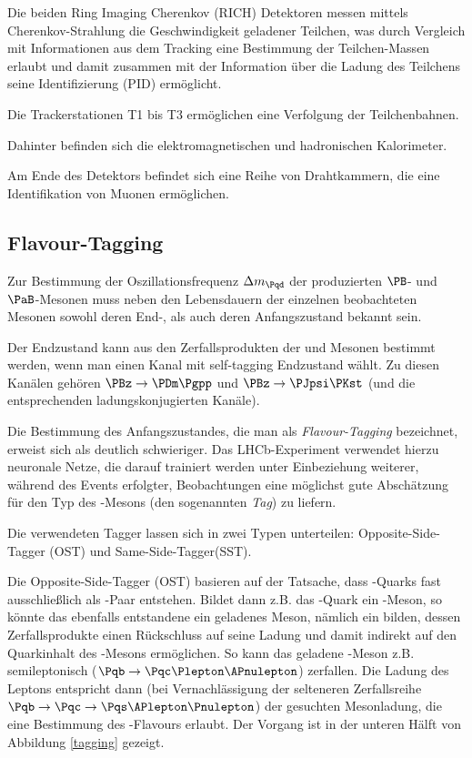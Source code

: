 Die beiden Ring Imaging Cherenkov (RICH) Detektoren messen mittels Cherenkov-Strahlung die Geschwindigkeit geladener Teilchen, was durch Vergleich mit Informationen aus dem Tracking eine Bestimmung der Teilchen-Massen erlaubt und damit zusammen mit der Information über die Ladung des Teilchens seine Identifizierung (PID) ermöglicht.

Die Trackerstationen T1 bis T3 ermöglichen eine Verfolgung der Teilchenbahnen.

Dahinter befinden sich die elektromagnetischen und hadronischen Kalorimeter.

Am Ende des Detektors befindet sich eine Reihe von Drahtkammern, die eine Identifikation von Muonen ermöglichen.



\begin{figure}
\end{figure}

\subsection{Flavour-Tagging}

Zur Bestimmung der Oszillationsfrequenz $\difference{m_{\Pqd}}$ der produzierten $\PB$- und $\PaB$-Mesonen muss neben den Lebensdauern der einzelnen beobachteten Mesonen sowohl deren End-, als auch deren Anfangszustand bekannt sein.

Der Endzustand kann aus den Zerfallsprodukten der \PBz und \PaBz Mesonen bestimmt werden, wenn man einen Kanal mit self-tagging Endzustand wählt.
Zu diesen Kanälen gehören $\PBz \to \PDm \Pgpp$ und $\PBz \to \PJpsi \PKst$ (und die entsprechenden ladungskonjugierten Kanäle).

Die Bestimmung des Anfangszustandes, die man als \emph{Flavour-Tagging} bezeichnet, erweist sich als deutlich schwieriger.
Das LHCb-Experiment verwendet hierzu neuronale Netze, die darauf trainiert werden unter Einbeziehung weiterer, während des Events erfolgter, Beobachtungen eine möglichst gute Abschätzung für den Typ des \PB-Mesons (den sogenannten \emph{Tag}) zu liefern.

Die verwendeten Tagger lassen sich in zwei Typen unterteilen: Opposite-Side-Tagger (OST) und Same-Side-Tagger(SST).

Die Opposite-Side-Tagger (OST) basieren auf der Tatsache, dass \Pqb-Quarks fast ausschließlich als \Pqb\Paqb-Paar entstehen. Bildet dann z.B. das \Pqb-Quark ein \PaB-Meson, so könnte das ebenfalls entstandene \Paqb ein geladenes Meson, nämlich ein \PBp bilden, dessen Zerfallsprodukte einen Rückschluss auf seine Ladung und damit indirekt auf den Quarkinhalt des \PaB-Mesons ermöglichen.
So kann das geladene \PB-Meson z.B. semileptonisch ($\Pqb \to \Pqc \Plepton \APnulepton$) zerfallen. Die Ladung des Leptons entspricht dann (bei Vernachlässigung der selteneren Zerfallsreihe $\Pqb \to \Pqc \to \Pqs \APlepton \Pnulepton$) der gesuchten Mesonladung, die eine Bestimmung des \PB-Flavours erlaubt.\cite{ost}
Der Vorgang ist in der unteren Hälft von Abbildung \ref{tagging} gezeigt.

